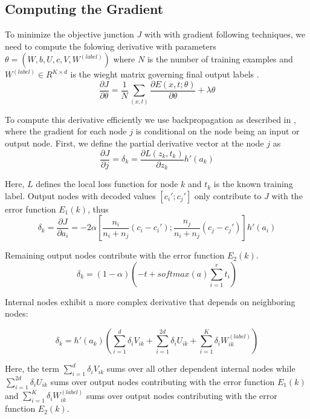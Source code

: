 \documentclass{article}
\begin{document}
%
%
\subsection{Computing the Gradient}
To minimize the objective junction $J$ with with gradient following techniques, we need to compute the folowing derivative with parameters $\theta = (W, b, U, c, V, W^{(label)})$ where $N$ is the number of training examples and $W^{(label)} \in R^{K \times d}$ is the wieght matrix governing final output labels \cite{Socher}.
\begin{equation}
    \frac{\partial J}{\partial \theta} = \frac{1}{N} \sum_{(x, t)} \frac{\partial E(x, t; \theta)}{\partial \theta} + \lambda \theta
\end{equation}

To compute this derivative efficiently we use backpropagation as described in \cite{CSE250B}, where the gradient for each node $j$ is conditional on the node being an input or output node. First, we define the partial derivative vector at the node $j$ as
\begin{equation}
    \frac{\partial J}{\partial j} = \delta_{k} = \frac{\partial L(z_k , t_k)}{\partial z_k} h'(a_k)
\end{equation}

Here, $L$ defines the local loss function for node $k$ and $t_k$ is the known training label. Output nodes with decoded values $[c_i' ; c_j']$ only contribute to $J$ with the error function $E_1(k)$, thus
\begin{equation}
    \delta_{k} = \frac{\partial J}{\partial a_i} = - 2 \alpha \left [ \frac{n_i}{n_i + n_j} (c_i - c_i');  \frac{n_j}{n_i + n_j} (c_j - c_j') \right ] h'(a_i)
\end{equation}


Remaining output nodes contribute with the error function $E_2(k)$.
\begin{equation}
    \delta_{k} = (1 - \alpha)(-t + softmax(a) \sum_{i=1}^r t_i )
\end{equation}

Internal nodes exhibit a more complex derivative that depends on neighboring nodes:

\begin{equation}
    \delta_{k} = h'(a_k)(\sum_{i=1}^d \delta_{i}V_{ik} + \sum_{i=1}^{2d} \delta_{i}U_{ik} + \sum_{i=1}^{K} \delta_{i} W^{(label)}_{ik})
\end{equation}

Here, the term $\sum_{i=1}^d \delta_{i}V_{ik}$ sums over all other dependent internal nodes while $\sum_{i=1}^{2d} \delta_{i}U_{ik}$ sums over output nodes contributing with the error function $E_1(k)$ and $\sum_{i=1}^{K} \delta_{i} W^{(label)}_{ik}$ sums over output nodes contributing with the error function $E_2(k)$.
%
%
\end{document}
